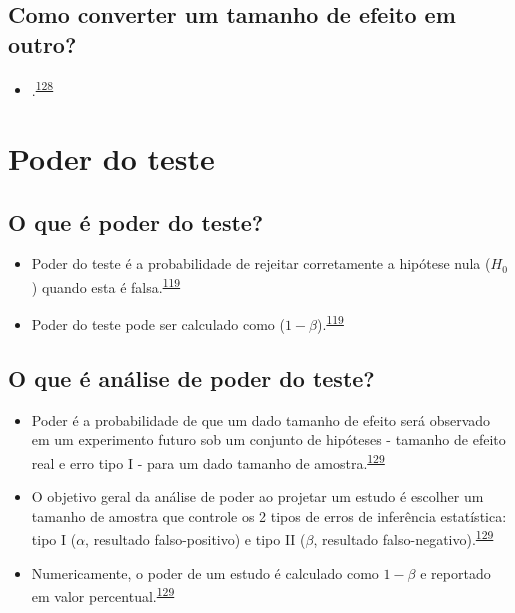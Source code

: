 \documentclass[
  a4paper,
]{book}
\providecommand{\tightlist}{%
  \setlength{\itemsep}{0pt}\setlength{\parskip}{0pt}}
\begin{document}
\hypertarget{como-converter-um-tamanho-de-efeito-em-outro}{%
\subsection{Como converter um tamanho de efeito em outro?}\label{como-converter-um-tamanho-de-efeito-em-outro}}

\begin{itemize}
\tightlist
\item
  .\textsuperscript{\protect\hyperlink{ref-Kim2015}{128}}
\end{itemize}

\hypertarget{poder-teste}{%
\section{Poder do teste}\label{poder-teste}}

\hypertarget{o-que-uxe9-poder-do-teste}{%
\subsection{O que é poder do teste?}\label{o-que-uxe9-poder-do-teste}}

\begin{itemize}
\item
  Poder do teste é a probabilidade de rejeitar corretamente a hipótese nula (\(H_{0}\)) quando esta é falsa.\textsuperscript{\protect\hyperlink{ref-Curran-Everett2009}{119}}
\item
  Poder do teste pode ser calculado como (\(1 - \beta\)).\textsuperscript{\protect\hyperlink{ref-Curran-Everett2009}{119}}
\end{itemize}

\hypertarget{o-que-uxe9-anuxe1lise-de-poder-do-teste}{%
\subsection{O que é análise de poder do teste?}\label{o-que-uxe9-anuxe1lise-de-poder-do-teste}}

\begin{itemize}
\item
  Poder é a probabilidade de que um dado tamanho de efeito será observado em um experimento futuro sob um conjunto de hipóteses - tamanho de efeito real e erro tipo I - para um dado tamanho de amostra.\textsuperscript{\protect\hyperlink{ref-heckman2022}{129}}
\item
  O objetivo geral da análise de poder ao projetar um estudo é escolher um tamanho de amostra que controle os 2 tipos de erros de inferência estatística: tipo I (\(\alpha\), resultado falso-positivo) e tipo II (\(\beta\), resultado falso-negativo).\textsuperscript{\protect\hyperlink{ref-heckman2022}{129}}
\item
  Numericamente, o poder de um estudo é calculado como \(1-\beta\) e reportado em valor percentual.\textsuperscript{\protect\hyperlink{ref-heckman2022}{129}}
\end{itemize}
\end{document}
